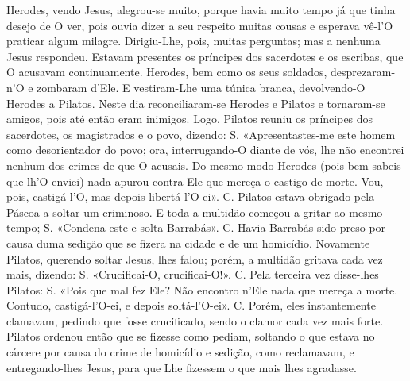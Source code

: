 \begin{paracol}{2}
{Herodes, vendo Jesus, alegrou-se muito, porque havia muito tempo já que tinha desejo de O ver, pois ouvia dizer a seu respeito muitas cousas e esperava vê-l’O praticar algum milagre. Dirigiu-Lhe, pois, muitas perguntas; mas a nenhuma Jesus respondeu. Estavam presentes os príncipes dos sacerdotes e os escribas, que O acusavam continuamente. Herodes, bem como os seus soldados, desprezaram-n’O e zombaram d’Ele. E vestiram-Lhe uma túnica branca, devolvendo-O Herodes a Pilatos. Neste dia reconciliaram-se Herodes e Pilatos e tornaram-se amigos, pois até então eram inimigos. Logo, Pilatos reuniu os príncipes dos sacerdotes, os magistrados e o povo, dizendo: {\redx S.} «Apresentastes-me este homem como desorientador do povo; ora, interrugando-O diante de vós, lhe não encontrei nenhum dos crimes de que O acusais. Do mesmo modo Herodes (pois bem sabeis que lh’O enviei) nada apurou contra Ele que mereça o castigo de morte. Vou, pois, castigá-l’O, mas depois libertá-l’O-ei». {\redx C.} Pilatos estava obrigado pela Páscoa a soltar um criminoso. E toda a multidão começou a gritar ao mesmo tempo; {\redx S.} «Condena este e solta Barrabás». {\redx C.} Havia Barrabás sido preso por causa duma sedição que se fizera na cidade e de um homicídio. Novamente Pilatos, querendo soltar Jesus, lhes falou; porém, a multidão gritava cada vez mais, dizendo: {\redx S.} «Crucificai-O, crucificai-O!». {\redx C.} Pela terceira vez disse-lhes Pilatos: {\redx S.} «Pois que mal fez Ele? Não encontro n’Ele nada que mereça a morte. Contudo, castigá-l’O-ei, e depois soltá-l’O-ei». {\redx C.} Porém, eles instantemente clamavam, pedindo que fosse crucificado, sendo o clamor cada vez mais forte. Pilatos ordenou então que se fizesse como pediam, soltando o que estava no cárcere por causa do crime de homicídio e sedição, como reclamavam, e entregando-lhes Jesus, para que Lhe fizessem o que mais lhes agradasse.
}\switchcolumn*\latim{
}
\end{paracol}

